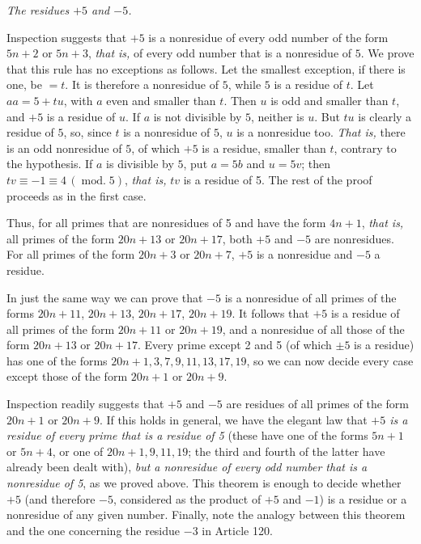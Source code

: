 \begin{center}\emph{The residues $+5$ and $-5$.}\end{center}

Inspection suggests that $+5$ is a nonresidue of every odd number of the form $5n+2$ or $5n+3$, \emph{that is,} of every odd number that is a nonresidue of $5$. We prove that this rule has no exceptions as follows. Let the smallest exception, if there is one, be $=t$. It is therefore a nonresidue of $5$, while $5$ is a residue of $t$. Let $aa=5+tu$, with $a$ even and smaller than $t$. Then $u$ is odd and smaller than $t$, and $+5$ is a residue of $u$. If $a$ is not divisible by $5$, neither is $u$. But $tu$ is clearly a residue of $5$, so, since $t$ is a nonresidue of $5$, $u$ is a nonresidue too. \emph{That is,} there is an odd nonresidue of $5$, of which $+5$ is a residue, smaller than $t$, contrary to the hypothesis. If $a$ is divisible by $5$, put $a=5b$ and $u=5v$; then $tv\equiv -1\equiv 4\,(\operatorname{mod.}5)$, \emph{that is,} $tv$ is a residue of 5. The rest of the proof proceeds as in the first case.

Thus, for all primes that are nonresidues of 5 and have the form $4n+1$, \emph{that is,} all primes of the form $20n+13$ or $20n+17$, both $+5$ and $-5$ are nonresidues. For all primes of the form $20n+3$ or $20n+7$, $+5$ is a nonresidue and $-5$ a residue.

In just the same way we can prove that $-5$ is a nonresidue of all primes of the forms $20n+11$, $20n+13$, $20n+17$, $20n+19$. It follows that $+5$ is a residue of all primes of the form $20n+11$ or $20n+19$, and a nonresidue of all those of the form $20n+13$ or $20n+17$. Every prime except 2 and 5 (of which $\pm 5$ is a residue) has one of the forms $20n+1,3,7,9,11,13,17,19$, so we can now decide every case except those of the form $20n+1$ or $20n+9$.

Inspection readily suggests that $+5$ and $-5$ are residues of all primes of the form $20n+1$ or $20n+9$. If this holds in general, we have the elegant law that \emph{$+5$ is a residue of every prime that is a residue of 5} (these have one of the forms $5n+1$ or $5n+4$, or one of $20n+1,9,11,19$; the third and fourth of the latter have already been dealt with), \emph{but a nonresidue of every odd number that is a nonresidue of 5}, as we proved above. This theorem is enough to decide whether $+5$ (and therefore $-5$, considered as the product of $+5$ and $-1$) is a residue or a nonresidue of any given number. Finally, note the analogy between this theorem and the one concerning the residue $-3$ in Article 120.

